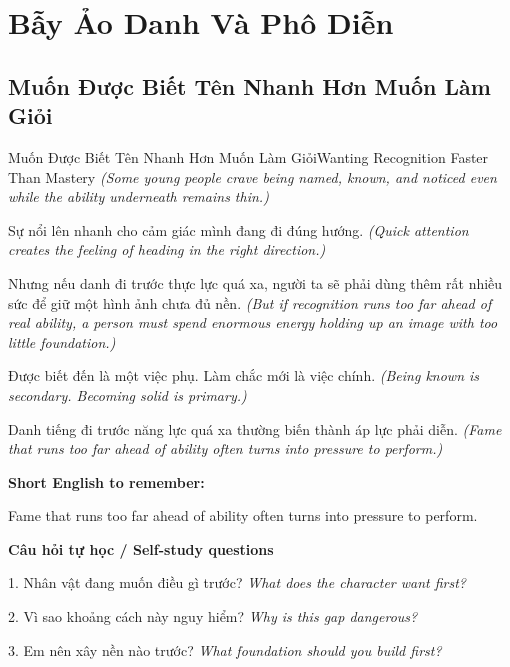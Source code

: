 \chapter{Bẫy Ảo Danh Và Phô Diễn}

\section{Muốn Được Biết Tên Nhanh Hơn Muốn Làm Giỏi}
\begin{truyen}{Muốn Được Biết Tên Nhanh Hơn Muốn Làm Giỏi}{Wanting Recognition Faster Than Mastery}
\textit{(Some young people crave being named, known, and noticed even while the ability underneath remains thin.)}

Sự nổi lên nhanh cho cảm giác mình đang đi đúng hướng.
\textit{(Quick attention creates the feeling of heading in the right direction.)}

Nhưng nếu danh đi trước thực lực quá xa, người ta sẽ phải dùng thêm rất nhiều sức để giữ một hình ảnh chưa đủ nền.
\textit{(But if recognition runs too far ahead of real ability, a person must spend enormous energy holding up an image with too little foundation.)}

Được biết đến là một việc phụ. Làm chắc mới là việc chính.
\textit{(Being known is secondary. Becoming solid is primary.)}

\end{truyen}

\begin{baihoc}
Danh tiếng đi trước năng lực quá xa thường biến thành áp lực phải diễn.
\textit{(Fame that runs too far ahead of ability often turns into pressure to perform.)}
\end{baihoc}

\begin{ghinhoanh}
\textbf{Short English to remember:}

Fame that runs too far ahead of ability often turns into pressure to perform.

\end{ghinhoanh}

\begin{tuhocnhanh}
\textbf{Câu hỏi tự học / Self-study questions}

1. Nhân vật đang muốn điều gì trước? \textit{What does the character want first?}

2. Vì sao khoảng cách này nguy hiểm? \textit{Why is this gap dangerous?}

3. Em nên xây nền nào trước? \textit{What foundation should you build first?}
\end{tuhocnhanh}
\ngancach

